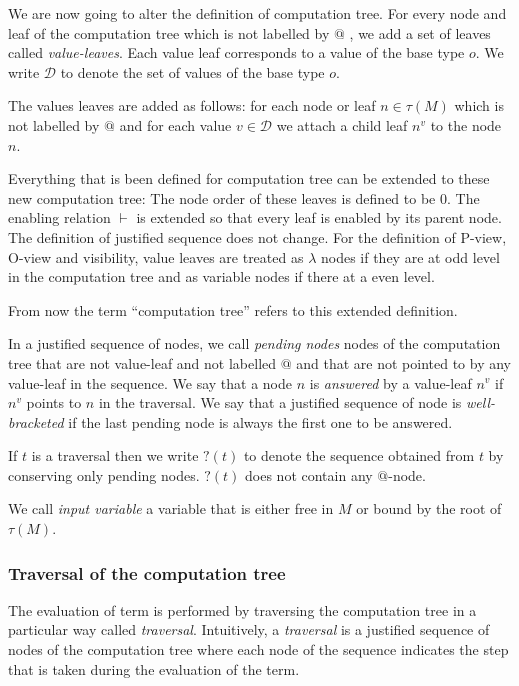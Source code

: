 We are now going to alter the definition of computation tree. For every node and leaf of the computation tree which is not labelled by $@$ ,
we add a set of leaves called \emph{value-leaves}. Each value leaf corresponds to a value of the base type $o$. We write $\mathcal{D}$
to denote the set of values of the base type $o$.

The values leaves are added as follows: for each node or leaf $n \in \tau(M)$ which is not labelled by $@$
and for each value $v \in \mathcal{D}$ we attach a child leaf $n^v$ to the node $n$.

Everything that is been defined for computation tree can be extended to these new computation tree:
The node order of these leaves is defined to be $0$. The enabling relation $\vdash$ is extended so that every leaf is enabled
by its parent node. The definition of justified sequence does not change.
For the definition of P-view, O-view and visibility, value leaves are treated as $\lambda$ nodes if they are at odd level in the computation tree and
as variable nodes if there at a even level.

From now the term ``computation tree'' refers to this extended definition.

In a justified sequence of nodes, we call \emph{pending nodes} nodes of the
computation tree that are not value-leaf and not labelled $@$ and
that are not pointed to by any value-leaf in the sequence. We say
that a node $n$ is \emph{answered} by a value-leaf
$n^v$ if $n^v$ points to $n$ in the traversal. We say that a
justified sequence of node is \emph{well-bracketed} if the last
pending node is always the first one to be answered.

If $t$ is a traversal then we write $?(t)$ to denote the sequence
obtained from $t$ by conserving only pending nodes. $?(t)$ does not contain any $@$-node.

We call \emph{input variable} a variable that is either free in $M$ or bound by the root of $\tau(M)$.

\subsubsection{Traversal of the computation tree}
The evaluation of term is performed by traversing the computation tree in a particular way called
\emph{traversal}. Intuitively, a \emph{traversal} is a justified sequence of nodes of the computation tree where each node
of the sequence indicates the step that is taken during the evaluation of the term.

